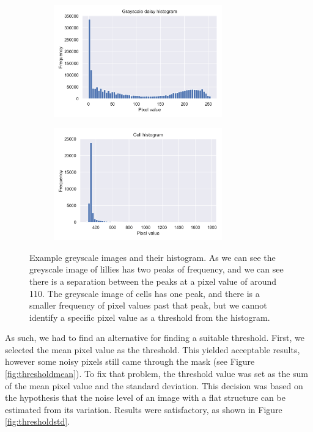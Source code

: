 \begin{figure}[h]
\begin{subfigure}{0.45\textwidth}
    \end{subfigure}
    \begin{subfigure}{0.45\textwidth}
        \centering
        \includegraphics[width=0.8\textwidth]{dissertation/figures/grayscale_histogram.png}
    \end{subfigure}
    \begin{subfigure}{0.45\textwidth}
        \centering
        \includegraphics[width=0.8\textwidth]{dissertation/figures/cell_histogram.png}
    \end{subfigure}
    \caption{Example greyscale images and their histogram. As we can see the greyscale image of lillies has two peaks of frequency, and we can see there is a separation between the peaks at a pixel value of around 110. The greyscale image of cells has one peak, and there is a smaller frequency of pixel values past that peak, but we cannot identify a specific pixel value as a threshold from the histogram.}
    \label{fig:thresholdhist}
\end{figure}

As such, we had to find an alternative for finding a suitable threshold. First, we selected the mean pixel value as the threshold. This yielded acceptable results, however some noisy pixels still came through the mask (see Figure \ref{fig:thresholdmean}). To fix that problem, the threshold value was set as the sum of the mean pixel value and the standard deviation. This decision was based on the hypothesis that the noise level of an image with a flat structure can be estimated from its variation. Results were satisfactory, as shown in Figure \ref{fig:thresholdstd}.

